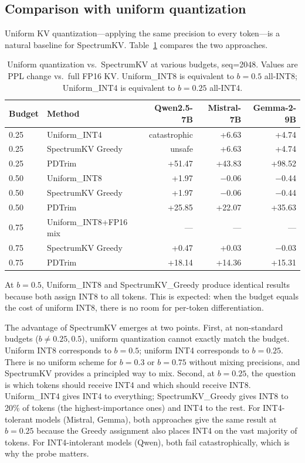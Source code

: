 \documentclass[11pt]{article}
\newcommand{\method}{SpectrumKV}
\newcommand{\budget}{b}
\newcommand{\pct}{\%}
\theoremstyle{plain}
\theoremstyle{definition}
\begin{document}
\subsection{Comparison with uniform quantization}
\label{sec:uniform-comparison}

Uniform KV quantization---applying the same precision to every token---is a natural baseline for \method{}.  Table~\ref{tab:uniform} compares the two approaches.

\begin{table}[t]
\centering
\caption{Uniform quantization vs.\ \method{} at various budgets, seq=2048.  Values are PPL change vs.\ full FP16 KV.  Uniform\_INT8 is equivalent to $\budget=0.5$ all-INT8; Uniform\_INT4 is equivalent to $\budget=0.25$ all-INT4.}
\label{tab:uniform}
\small
\begin{tabular}{llrrr}
\toprule
Budget & Method & Qwen2.5-7B & Mistral-7B & Gemma-2-9B \\
\midrule
0.25 & Uniform\_INT4 & catastrophic & +6.63 & +4.74 \\
0.25 & \method{} Greedy & unsafe & +6.63 & +4.74 \\
0.25 & PDTrim & +51.47 & +43.83 & +98.52 \\
\midrule
0.50 & Uniform\_INT8 & +1.97 & $-$0.06 & $-$0.44 \\
0.50 & \method{} Greedy & +1.97 & $-$0.06 & $-$0.44 \\
0.50 & PDTrim & +25.85 & +22.07 & +35.63 \\
\midrule
0.75 & Uniform\_INT8+FP16 mix & --- & --- & --- \\
0.75 & \method{} Greedy & +0.47 & +0.03 & $-$0.03 \\
0.75 & PDTrim & +18.14 & +14.36 & +15.31 \\
\bottomrule
\end{tabular}
\end{table}

At $\budget=0.5$, Uniform\_INT8 and \method{}\_Greedy produce identical results because both assign INT8 to all tokens.  This is expected: when the budget equals the cost of uniform INT8, there is no room for per-token differentiation.

The advantage of \method{} emerges at two points.  First, at non-standard budgets ($\budget \ne 0.25, 0.5$), uniform quantization cannot exactly match the budget.  Uniform INT8 corresponds to $\budget=0.5$; uniform INT4 corresponds to $\budget=0.25$.  There is no uniform scheme for $\budget=0.3$ or $\budget=0.75$ without mixing precisions, and \method{} provides a principled way to mix.  Second, at $\budget=0.25$, the question is which tokens should receive INT4 and which should receive INT8.  Uniform\_INT4 gives INT4 to everything; \method{}\_Greedy gives INT8 to 20\pct{} of tokens (the highest-importance ones) and INT4 to the rest.  For INT4-tolerant models (Mistral, Gemma), both approaches give the same result at $\budget=0.25$ because the Greedy assignment also places INT4 on the vast majority of tokens.  For INT4-intolerant models (Qwen), both fail catastrophically, which is why the probe matters.
\end{document}
